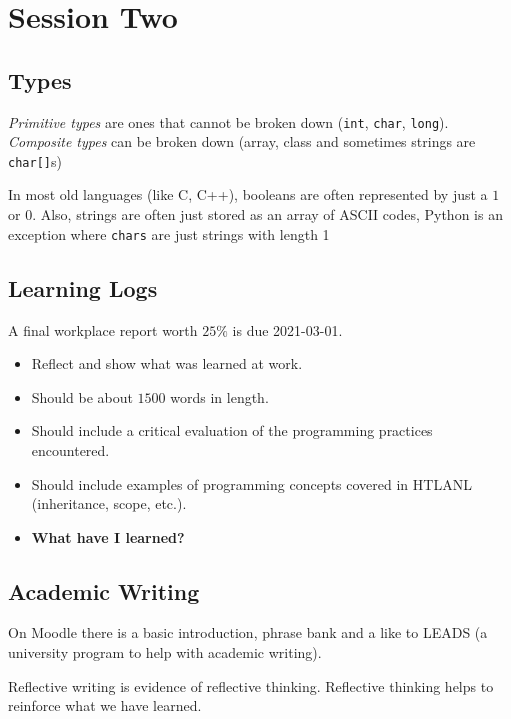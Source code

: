 \section{Session Two}\label{sub:session_2_types}

\subsection{Types}\label{ssub:types}

\emph{Primitive types} are ones that cannot be broken down (\texttt{int}, \texttt{char}, \texttt{long}).
\emph{Composite types} can be broken down (array, class and sometimes strings are \texttt{char[]}s)

\begin{note}
    In most old languages (like C, C++), booleans are often represented by just a \(1\) or  \(0\).
    Also, strings are often just stored as an array of ASCII codes, Python is an exception where \texttt{chars} are just strings with length 1
\end{note}

\subsection{Learning Logs}\label{ssub:learning_logs}

A final workplace report worth \(25\%\) is due 2021-03-01.
\begin{itemize}
    \item Reflect and show what was learned at work.
    \item Should be about \(1500\) words in length.
    \item Should include a critical evaluation of the programming practices encountered.
    \item Should include examples of programming concepts covered in HTLANL (inheritance, scope, etc.).
    \item \textbf{What have I learned?}
\end{itemize}

\subsection{Academic Writing}\label{ssub:academic_writing}

On Moodle there is a basic introduction, phrase bank and a like to LEADS (a university program to help with academic writing).

Reflective writing is evidence of reflective thinking.
Reflective thinking helps to reinforce what we have learned.

